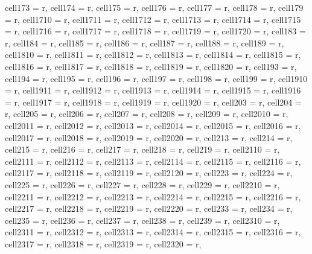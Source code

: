 \documentclass[journal]{IEEEtran}
\begin{document}
\begin{table}
\begin{adjustbox}{width=\textwidth}
\begin{tblr}
{  cell{17}{3} = {r},  cell{17}{4} = {r},  cell{17}{5} = {r},  cell{17}{6} = {r},  cell{17}{7} = {r},  cell{17}{8} = {r},  cell{17}{9} = {r},  cell{17}{10} = {r},  cell{17}{11} = {r},  cell{17}{12} = {r},  cell{17}{13} = {r},  cell{17}{14} = {r},  cell{17}{15} = {r},  cell{17}{16} = {r},  cell{17}{17} = {r},  cell{17}{18} = {r},  cell{17}{19} = {r},  cell{17}{20} = {r},  cell{18}{3} = {r},  cell{18}{4} = {r},  cell{18}{5} = {r},  cell{18}{6} = {r},  cell{18}{7} = {r},  cell{18}{8} = {r},  cell{18}{9} = {r},  cell{18}{10} = {r},  cell{18}{11} = {r},  cell{18}{12} = {r},  
  cell{18}{13} = {r},  cell{18}{14} = {r},  cell{18}{15} = {r},  cell{18}{16} = {r},  cell{18}{17} = {r},  cell{18}{18} = {r},  cell{18}{19} = {r},  cell{18}{20} = {r},  cell{19}{3} = {r},  cell{19}{4} = {r},  cell{19}{5} = {r},  cell{19}{6} = {r},  cell{19}{7} = {r},  cell{19}{8} = {r},  cell{19}{9} = {r},  cell{19}{10} = {r},  cell{19}{11} = {r},  cell{19}{12} = {r},  cell{19}{13} = {r},  cell{19}{14} = {r},  cell{19}{15} = {r},  
  cell{19}{16} = {r},  cell{19}{17} = {r},  cell{19}{18} = {r},  cell{19}{19} = {r},  cell{19}{20} = {r},  cell{20}{3} = {r},  cell{20}{4} = {r},  cell{20}{5} = {r},  cell{20}{6} = {r},  cell{20}{7} = {r},  cell{20}{8} = {r},  cell{20}{9} = {r},  cell{20}{10} = {r},  cell{20}{11} = {r},  cell{20}{12} = {r},  cell{20}{13} = {r},  cell{20}{14} = {r},  cell{20}{15} = {r},  cell{20}{16} = {r},  cell{20}{17} = {r},  cell{20}{18} = {r},  
  cell{20}{19} = {r},  cell{20}{20} = {r},  cell{21}{3} = {r},  cell{21}{4} = {r},  cell{21}{5} = {r},  cell{21}{6} = {r},  cell{21}{7} = {r},  cell{21}{8} = {r},  cell{21}{9} = {r},  cell{21}{10} = {r},  cell{21}{11} = {r},  cell{21}{12} = {r},  cell{21}{13} = {r},  cell{21}{14} = {r},  cell{21}{15} = {r},  cell{21}{16} = {r},  cell{21}{17} = {r},  cell{21}{18} = {r},  cell{21}{19} = {r},  cell{21}{20} = {r},  cell{22}{3} = {r},  cell{22}{4} = {r},  cell{22}{5} = {r},  cell{22}{6} = {r},  cell{22}{7} = {r},  cell{22}{8} = {r},  cell{22}{9} = {r},  cell{22}{10} = {r},  
  cell{22}{11} = {r},  cell{22}{12} = {r},  cell{22}{13} = {r},  cell{22}{14} = {r},  cell{22}{15} = {r},  cell{22}{16} = {r},  cell{22}{17} = {r},  cell{22}{18} = {r},  cell{22}{19} = {r},  cell{22}{20} = {r},  cell{23}{3} = {r},  cell{23}{4} = {r},  cell{23}{5} = {r},  cell{23}{6} = {r},  cell{23}{7} = {r},  cell{23}{8} = {r},  cell{23}{9} = {r},  cell{23}{10} = {r},  cell{23}{11} = {r},  cell{23}{12} = {r},  cell{23}{13} = {r},  cell{23}{14} = {r},  cell{23}{15} = {r},  cell{23}{16} = {r},  cell{23}{17} = {r},  cell{23}{18} = {r},  cell{23}{19} = {r},  cell{23}{20} = {r},  
}
\end{tblr}
\end{adjustbox}
\end{table}
\end{document}
